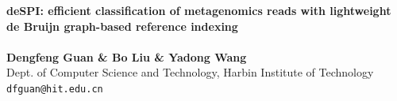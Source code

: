 \documentclass[a0,portrait]{a0poster}
\begin{document}


\begin{minipage}[b]{.8\linewidth}
\Huge \color{NavyBlue} \textbf{deSPI: efficient classification of metagenomics reads with lightweight de Bruijn graph-based reference indexing} \color{Black}\\ %
\\
\huge \textbf{Dengfeng Guan \& Bo Liu \& Yadong Wang}\\[0.5cm] %
\huge Dept. of Computer Science and Technology, Harbin Institute of Technology\\[0.4cm] %
\Large \texttt{dfguan@hit.edu.cn}\\
\end{minipage}
%

\vspace{1cm} %

\end{document}
